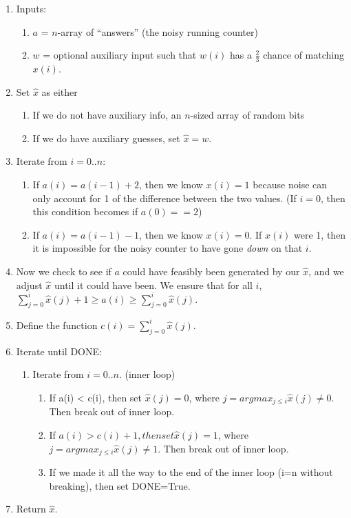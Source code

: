 \begin{enumerate}
    \item Inputs: 
        \begin{enumerate}
            \item $a$ = $n$-array of ``answers'' (the noisy running counter)
            \item $w$ = optional auxiliary input such that $w(i)$ has a $\frac23$ chance of matching $x(i)$.
        \end{enumerate}
    \item Set $\hat{x}$ as either
        \begin{enumerate}
            \item If we do not have auxiliary info, an $n$-sized array of random bits
            \item If we do have auxiliary guesses, set $\hat{x} = w$.
        \end{enumerate}
    \item Iterate from $i=0..n$:
        \begin{enumerate}
            \item If $a(i) = a(i-1)+2$, then we know $x(i) = 1$ because noise can only account for 1 of the
                difference between the two values.  (If $i=0$, then this condition becomes if $a(0)==2$)
            \item If $a(i) = a(i-1)-1$, then we know $x(i) = 0$. If $x(i)$ were 1, then it is impossible for
                the noisy counter to have gone \emph{down} on that $i$.
        \end{enumerate}
    \item Now we check to see if $a$ could have feasibly been generated by our $\hat{x}$, and we adjust
        $\hat{x}$ until it could have been.  We ensure that for all $i$, $\sum_{j=0}^i \hat{x}(j) + 1 \ge a(i)
        \ge \sum_{j=0}^i \hat{x}(j)$.
    \item Define the function $c(i) = \sum_{j=0}^i \hat{x}(j)$.
    \item Iterate until DONE:
        \begin{enumerate}
            \item Iterate from $i=0..n$. (inner loop)
                \begin{enumerate}
                    \item If a(i) < c(i), then set $\hat{x}(j) = 0$, where $j = argmax_{j \le i} \hat{x}(j) 
                        \ne 0$.  Then break out of inner loop.
                    \item If $a(i) > c(i)+1, then set \hat{x}(j) = 1$, where $j = argmax_{j \le i} \hat{x}(j)
                        \ne 1$.  Then break out of inner loop.
                    \item If we made it all the way to the end of the inner loop (i=n without breaking), then
                        set DONE=True.
                \end{enumerate}
        \end{enumerate}
    \item Return $\hat{x}$.
\end{enumerate}

